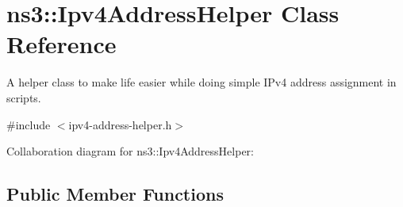 \hypertarget{classns3_1_1Ipv4AddressHelper}{}\section{ns3\+:\+:Ipv4\+Address\+Helper Class Reference}
\label{classns3_1_1Ipv4AddressHelper}


A helper class to make life easier while doing simple I\+Pv4 address assignment in scripts.  




{\ttfamily \#include $<$ipv4-\/address-\/helper.\+h$>$}



Collaboration diagram for ns3\+:\+:Ipv4\+Address\+Helper\+:
\subsection*{Public Member Functions}
